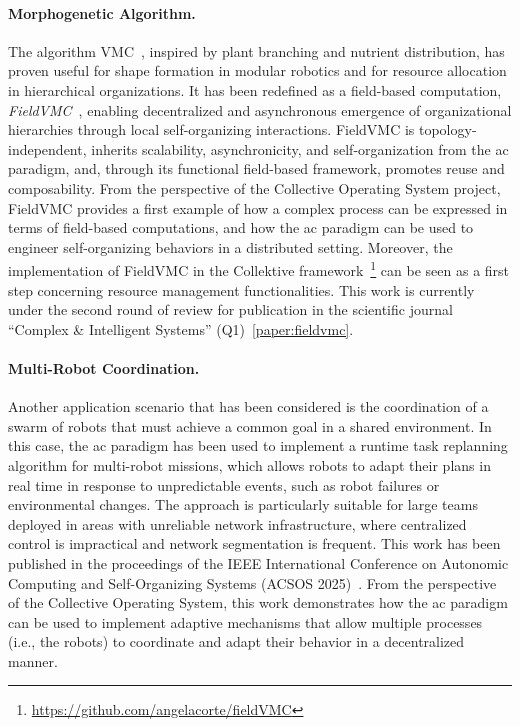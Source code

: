 \documentclass[runningheads]{llncs}
\begin{document}
    \paragraph{Morphogenetic Algorithm.}
    The algorithm \ac{VMC}~\cite{DBLP:conf/gecco/ZahadatHS17},
    inspired by plant branching and nutrient distribution,
    has proven useful for shape formation in modular robotics
    and for resource allocation in hierarchical organizations.
%
    It has been redefined as a field-based computation, \emph{FieldVMC}~\cite{DBLP:conf/acsos/CortecchiaPCC24},
    enabling decentralized and asynchronous emergence of organizational hierarchies
    through local self-organizing interactions.
%
    FieldVMC is topology-independent, inherits scalability, asynchronicity, and self-organization from the \ac{ac} paradigm,
    and, through its functional field-based framework, promotes reuse and composability.
%
    From the perspective of the Collective Operating System project,
    FieldVMC provides a first example of how a complex process can be expressed in terms of field-based computations,
    and how the \ac{ac} paradigm can be used to engineer self-organizing behaviors in a distributed setting.
%
    Moreover,
    the implementation of FieldVMC in the Collektive framework~\footnote{\url{https://github.com/angelacorte/fieldVMC}}
    can be seen as a first step concerning resource management functionalities.
%
    This work is currently under the second round of review for publication in the scientific journal ``Complex \& Intelligent Systems'' (Q1)~\ref{paper:fieldvmc}.

    \paragraph{Multi-Robot Coordination.}
    Another application scenario that has been considered is the coordination of a swarm of robots that must achieve a common goal in a shared environment.
%
    In this case,
    the \ac{ac} paradigm has been used to implement a runtime task replanning algorithm for multi-robot missions,
    which allows robots to adapt their plans in real time in response to unpredictable events, such as
    robot failures or environmental changes.
%
    The approach is particularly suitable for large teams deployed in areas with unreliable network infrastructure,
    where centralized control is impractical and network segmentation is frequent.
    This work has been published in the proceedings of the IEEE International Conference on Autonomic Computing and Self-Organizing Systems (ACSOS 2025)~\cite{DBLP:conf/acsos/AguzziBCMPPV25}.
%
    From the perspective of the Collective Operating System,
    this work demonstrates how the \ac{ac} paradigm can be used to implement adaptive mechanisms
    that allow multiple processes (i.e., the robots) to coordinate and adapt their behavior in a decentralized manner.
\end{document}
